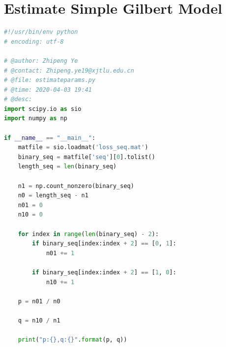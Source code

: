 \documentclass[11pt]{article}
\begin{document}
\section{Estimate Simple Gilbert Model} \label{ESGM}
\begin{lstlisting}[language=Python]
    #!/usr/bin/env python
# encoding: utf-8

# @author: Zhipeng Ye
# @contact: Zhipeng.ye19@xjtlu.edu.cn
# @file: estimateparams.py
# @time: 2020-04-03 19:41
# @desc:
import scipy.io as sio
import numpy as np

if __name__ == "__main__":
    matfile = sio.loadmat('loss_seq.mat')
    binary_seq = matfile['seq'][0].tolist()
    length_seq = len(binary_seq)

    n1 = np.count_nonzero(binary_seq)
    n0 = length_seq - n1
    n01 = 0
    n10 = 0

    for index in range(len(binary_seq) - 2):
        if binary_seq[index:index + 2] == [0, 1]:
            n01 += 1

        if binary_seq[index:index + 2] == [1, 0]:
            n10 += 1

    p = n01 / n0

    q = n10 / n1

    print("p:{},q:{}".format(p, q))

\end{lstlisting}
\end{document}
